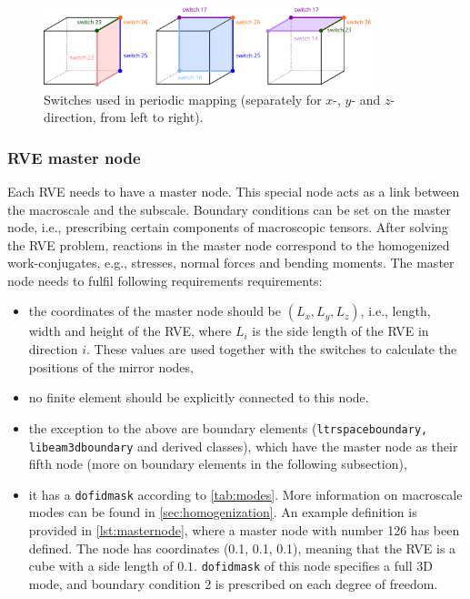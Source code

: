 \documentclass[11pt]{article}
\begin{document}
\begin{figure}
    \centering
    \includegraphics[width=0.85\textwidth]{img/switches.pdf}
    \caption{Switches used in periodic mapping (separately for $x$-, $y$- and $z$-direction, from left to right).}
    \label{fig:switches}
\end{figure}

\subsubsection{RVE master node}

Each RVE needs to have a master node. 
This special node acts as a link between the macroscale and the subscale. Boundary conditions can be set on the master node, i.e., prescribing certain components of macroscopic tensors. 
After solving the RVE problem, reactions in the master node correspond to the homogenized work-conjugates, e.g., stresses, normal forces and bending moments. The master node needs to fulfil following requirements requirements:
\begin{itemize}
    \item the coordinates of the master node should be $(L_x, L_y, L_z)$, i.e., length, width and height of the RVE, where $L_i$ is the side length of the RVE in direction $i$. These values are used together with the switches to calculate the positions of the mirror nodes,
    \item no finite element should be explicitly connected to this node.
    \item the exception to the above are boundary elements (\texttt{ltrspaceboundary, libeam3dboundary} and derived classes), which have the master node as their fifth node
    (more on boundary elements in the following subsection),
    \item it has a \texttt{dofidmask} according to \cref{tab:modes}. More information on macroscale modes can be found in \cref{sec:homogenization}. An example definition is provided in \cref{lst:masternode}, where a master node with number 126 has been defined. 
    The node has coordinates (0.1, 0.1, 0.1), meaning that the RVE is a cube with a side length of $0.1$. \texttt{dofidmask} of this node specifies a full 3D mode, and boundary condition 2 is prescribed on each degree of freedom.
\end{itemize}
\end{document}
